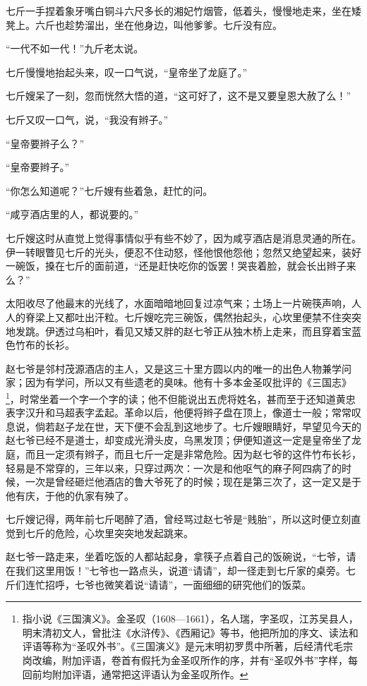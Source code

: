 \documentclass[12pt,UTF8]{ctexbook}
\begin{document}
七斤一手捏着象牙嘴白铜斗六尺多长的湘妃竹烟管，低着头，慢慢地走来，坐在矮凳上。六斤也趁势溜出，坐在他身边，叫他爹爹。七斤没有应。

“一代不如一代！”九斤老太说。

七斤慢慢地抬起头来，叹一口气说，“皇帝坐了龙庭了。”

七斤嫂呆了一刻，忽而恍然大悟的道，“这可好了，这不是又要皇恩大赦了么！”

七斤又叹一口气，说，“我没有辫子。”

“皇帝要辫子么？”

“皇帝要辫子。”

“你怎么知道呢？”七斤嫂有些着急，赶忙的问。

“咸亨酒店里的人，都说要的。”

七斤嫂这时从直觉上觉得事情似乎有些不妙了，因为咸亨酒店是消息灵通的所在。伊一转眼瞥见七斤的光头，便忍不住动怒，怪他恨他怨他；忽然又绝望起来，装好一碗饭，搡在七斤的面前道，“还是赶快吃你的饭罢！哭丧着脸，就会长出辫子来么？”

太阳收尽了他最末的光线了，水面暗暗地回复过凉气来；土场上一片碗筷声响，人人的脊梁上又都吐出汗粒。七斤嫂吃完三碗饭，偶然抬起头，心坎里便禁不住突突地发跳。伊透过乌桕叶，看见又矮又胖的赵七爷正从独木桥上走来，而且穿着宝蓝色竹布的长衫。

赵七爷是邻村茂源酒店的主人，又是这三十里方圆以内的唯一的出色人物兼学问家；因为有学问，所以又有些遗老的臭味。他有十多本金圣叹批评的《三国志》\footnote{指小说《三国演义》。金圣叹（1608—1661），名人瑞，字圣叹，江苏吴县人，明末清初文人，曾批注《水浒传》、《西厢记》等书，他把所加的序文、读法和评语等称为“圣叹外书”。《三国演义》是元末明初罗贯中所著，后经清代毛宗岗改编，附加评语，卷首有假托为金圣叹所作的序，并有“圣叹外书”字样，每回前均附加评语，通常把这评语认为金圣叹所作。}，时常坐着一个字一个字的读；他不但能说出五虎将姓名，甚而至于还知道黄忠表字汉升和马超表字孟起。革命以后，他便将辫子盘在顶上，像道士一般；常常叹息说，倘若赵子龙在世，天下便不会乱到这地步了。七斤嫂眼睛好，早望见今天的赵七爷已经不是道士，却变成光滑头皮，乌黑发顶；伊便知道这一定是皇帝坐了龙庭，而且一定须有辫子，而且七斤一定是非常危险。因为赵七爷的这件竹布长衫，轻易是不常穿的，三年以来，只穿过两次：一次是和他呕气的麻子阿四病了的时候，一次是曾经砸烂他酒店的鲁大爷死了的时候；现在是第三次了，这一定又是于他有庆，于他的仇家有殃了。

七斤嫂记得，两年前七斤喝醉了酒，曾经骂过赵七爷是“贱胎”，所以这时便立刻直觉到七斤的危险，心坎里突突地发起跳来。

赵七爷一路走来，坐着吃饭的人都站起身，拿筷子点着自己的饭碗说，“七爷，请在我们这里用饭！”七爷也一路点头，说道“请请”，却一径走到七斤家的桌旁。七斤们连忙招呼，七爷也微笑着说“请请”，一面细细的研究他们的饭菜。
\end{document}
